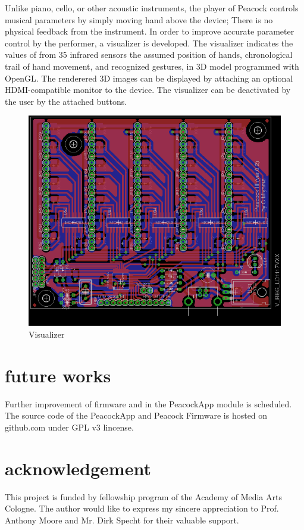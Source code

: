 \documentclass{nime-alternate}
\begin{document}
Unlike piano, cello, or other acoustic instruments, the player of Peacock controls musical parameters by simply moving hand above the device; There is no physical feedback from the instrument. In order to improve accurate parameter control by the performer, a visualizer is developed.  The visualizer indicates the values of from 35 infrared sensors  the assumed position of hands, chronological trail of hand movement, and recognized gestures, in  3D model programmed with OpenGL\cite{OpenGL}. The renderered 3D images can be displayed by attaching an optional HDMI-compatible monitor to the device.
The visualizer can be deactivated by the user by the attached buttons.
\begin{figure}[htbp]
       \begin{center}
              \includegraphics[width=\columnwidth, bb=0 0 621 517]{board.png}
       \end{center}
       \caption{Visualizer}
       \label{fig:visualizer}
\end{figure}


\section{future works}

Further improvement of firmware and in the PeacockApp module is scheduled.
The source code of the PeacockApp and Peacock Firmware is hosted on github.com under GPL v3 lincense.


\section{acknowledgement}
This project is funded by fellowship program of the Academy of Media Arts Cologne. The author would like to express my sincere appreciation to Prof. Anthony Moore and Mr. Dirk Specht for their valuable support.



\end{document}
